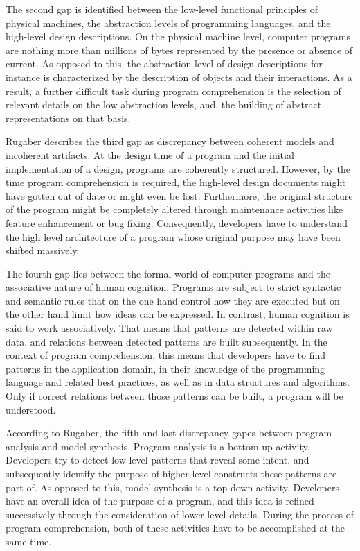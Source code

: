 The second gap is identified between the low-level functional principles of physical machines, the abstraction levels of programming languages, and the high-level design descriptions.
On the physical machine level, computer programs are nothing more than millions of bytes represented by the presence or absence of current.
As opposed to this, the abstraction level of design descriptions for instance is characterized by the description of objects and their interactions.
As a result, a further difficult task during program comprehension is the selection of relevant details on the low abstraction levels, and, the building of abstract representations on that basis.

Rugaber describes the third gap as discrepancy between coherent models and incoherent artifacts.
At the design time of a program and the initial implementation of a design, programs are coherently structured.
However, by the time program comprehension is required, the high-level design documents might have gotten out of date or might even be lost.
Furthermore, the original structure of the program might be completely altered through maintenance activities like feature enhancement or bug fixing.
Consequently, developers have to understand the high level architecture of a program whose original purpose may have been shifted massively.

The fourth gap lies between the formal world of computer programs and the associative nature of human cognition.
Programs are subject to strict syntactic and semantic rules that on the one hand control how they are executed but on the other hand limit how ideas can be expressed.
In contrast, human cognition is said to work associatively.
That means that patterns are detected within raw data, and relations between detected patterns are built subsequently.
In the context of program comprehension, this means that developers have to find patterns in the application domain, in their knowledge of the programming language and related best practices, as well as in data structures and algorithms.
Only if correct relations between those patterns can be built, a program will be understood.

According to Rugaber, the fifth and last discrepancy gapes between program analysis and model synthesis.
Program analysis is a bottom-up activity.
Developers try to detect low level patterns that reveal some intent, and subsequently identify the purpose of higher-level constructs these patterns are part of.
As opposed to this, model synthesis is a top-down activity.
Developers have an overall idea of the purpose of a program, and this idea is refined successively through the consideration of lower-level details.
During the process of program comprehension, both of these activities have to be accomplished at the same time.


